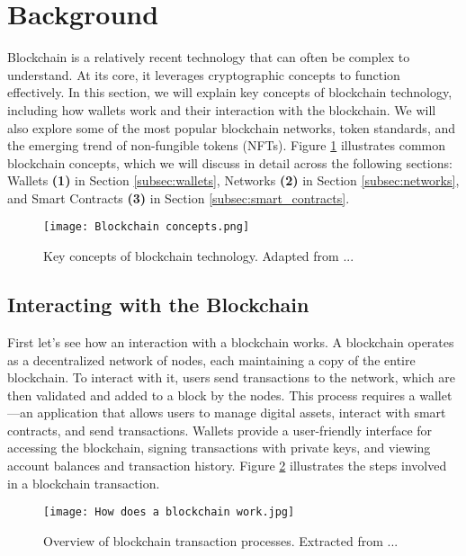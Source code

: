 \section{Background}
\label{sec:background}

Blockchain is a relatively recent technology that can often be complex to
understand. At its core, it leverages cryptographic concepts to function
effectively. In this section, we will explain key concepts of blockchain
technology, including how wallets work and their interaction with the
blockchain. We will also explore some of the most popular blockchain networks,
token standards, and the emerging trend of non-fungible tokens (NFTs). Figure
\ref{fig:blockchain_concepts} illustrates common blockchain concepts, which we
will discuss in detail across the following sections: Wallets \textbf{(1)} in
Section \ref{subsec:wallets}, Networks \textbf{(2)} in Section
\ref{subsec:networks}, and Smart Contracts \textbf{(3)} in Section
\ref{subsec:smart_contracts}.

\begin{figure}[H]
    \centering
    \texttt{[image: Blockchain concepts.png]}
    \caption[Blockchain concepts]{Key concepts of blockchain technology. Adapted from ...}
    \label{fig:blockchain_concepts}
\end{figure}

\subsection{Interacting with the Blockchain}
\label{subsec:interacting_with_the_blockchain}

First let's see how an interaction with a blockchain works. A blockchain
operates as a decentralized network of nodes, each maintaining a copy of the
entire blockchain. To interact with it, users send transactions to the network,
which are then validated and added to a block by the nodes. This process
requires a wallet—an application that allows users to manage digital assets,
interact with smart contracts, and send transactions. Wallets provide a
user-friendly interface for accessing the blockchain, signing transactions with
private keys, and viewing account balances and transaction history. Figure
\ref{fig:how_does_a_blockchain_work} illustrates the steps involved in a
blockchain transaction.

\begin{figure}[H]
    \centering
    \texttt{[image: How does a blockchain work.jpg]}
    \caption[How does a blockchain work]{Overview of blockchain transaction processes. Extracted from ...}
    \label{fig:how_does_a_blockchain_work}
\end{figure}

